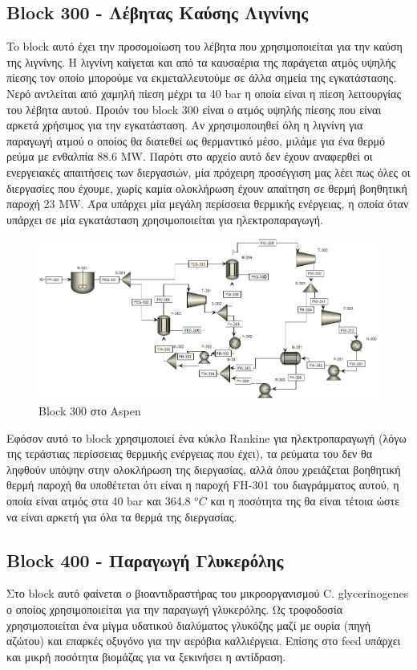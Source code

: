 \documentclass[11pt]{article}
\begin{document}
\subsection{Block 300 - Λέβητας Καύσης Λιγνίνης}
\label{sec:org7a5d78f}
To block αυτό έχει την προσομοίωση του λέβητα που χρησιμοποιείται για την καύση της λιγνίνης. Η λιγνίνη καίγεται και από τα καυσαέρια της παράγεται ατμός υψηλής πίεσης τον οποίο μπορούμε να εκμεταλλευτούμε σε άλλα σημεία της εγκατάστασης. Νερό αντλείται από χαμηλή πίεση μέχρι τα 40 bar η οποία είναι η πίεση λειτουργίας του λέβητα αυτού. Προιόν του block 300 είναι ο ατμός υψηλής πίεσης που είναι αρκετά χρήσιμος για την εγκατάσταση. Αν χρησιμοποιηθεί όλη η λιγνίνη για παραγωγή ατμού ο οποίος θα διατεθεί ως θερμαντικό μέσο, μιλάμε για ένα θερμό ρεύμα με ενθαλπία 88.6 MW. Παρότι στο αρχείο αυτό δεν έχουν αναφερθεί οι ενεργειακές απαιτήσεις των διεργασιών, μία πρόχειρη προσέγγιση μας λέει πως όλες οι διεργασίες που έχουμε, χωρίς καμία ολοκλήρωση έχουν απαίτηση σε θερμή βοηθητική παροχή 23 MW. Άρα υπάρχει μία μεγάλη περίσσεια θερμικής ενέργειας, η οποία όταν υπάρχει σε μία εγκατάσταση χρησιμοποιείται για ηλεκτροπαραγωγή.

\begin{figure}[htbp]
\centering
\includegraphics[width=.9\linewidth]{Block_300_-_Λέβητας_Καύσης_Λιγνίνης/2023-03-11_17-09-00_screenshot.png}
\caption{Block 300 στο Aspen}
\end{figure}

Εφόσον αυτό το block χρησιμοποιεί ένα κύκλο Rankine για ηλεκτροπαραγωγή (λόγω της τεράστιας περίσσειας θερμικής ενέργειας που έχει), τα ρεύματα του δεν θα ληφθούν υπόψην στην ολοκλήρωση της διεργασίας, αλλά όπου χρειάζεται βοηθητική θερμή παροχή θα υποθέτεται ότι είναι η παροχή FH-301 του διαγράμματος αυτού, η οποία είναι ατμός στα 40 bar και 364.8 \(^oC\) και η ποσότητα της θα είναι τέτοια ώστε να είναι αρκετή για όλα τα θερμά της διεργασίας.

\subsection{Block 400 - Παραγωγή Γλυκερόλης}
\label{sec:org84b88cc}
Στο block αυτό φαίνεται ο βιοαντιδραστήρας του μικροοργανισμού C. glycerinogenes ο οποίος χρησιμοποιείται για την παραγωγή γλυκερόλης. Ως τροφοδοσία χρησιμοποιείται ένα μίγμα υδατικού διαλύματος γλυκόζης μαζί με ουρία (πηγή αζώτου) και επαρκές οξυγόνο για την αερόβια καλλιέργεια. Επίσης στο feed υπάρχει και μικρή ποσότητα βιομάζας για να ξεκινήσει η αντίδραση.
\end{document}

